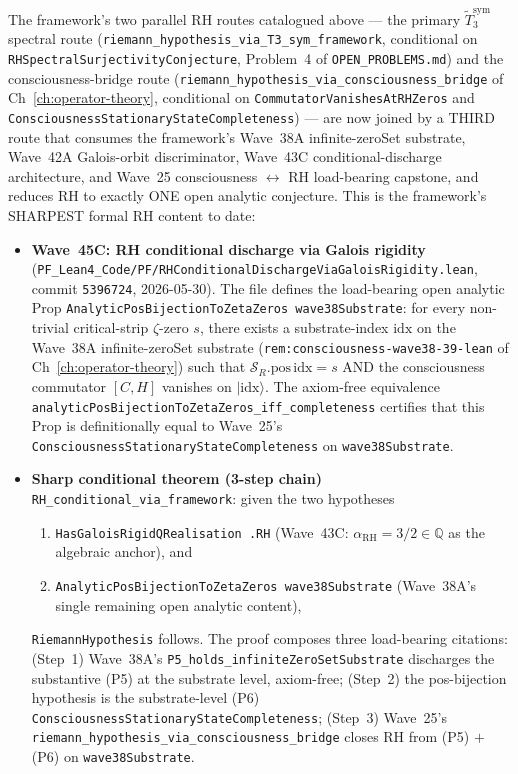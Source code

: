 \begin{remark}\label{rem:rh-wave45c-lean}
The framework's two parallel RH routes catalogued above --- the primary $\widetilde{T}_3^{\mathrm{sym}}$ spectral route (\texttt{riemann\_hypothesis\_via\_T3\_sym\_framework}, conditional on \texttt{RHSpectralSurjectivityConjecture}, Problem~4 of \texttt{OPEN\_PROBLEMS.md}) and the consciousness-bridge route (\texttt{riemann\_hypothesis\_via\_consciousness\_bridge} of Ch~\ref{ch:operator-theory}, conditional on \texttt{CommutatorVanishesAtRHZeros} and \texttt{ConsciousnessStationaryStateCompleteness}) --- are now joined by a THIRD route that consumes the framework's Wave~38A infinite-zeroSet substrate, Wave~42A Galois-orbit discriminator, Wave~43C conditional-discharge architecture, and Wave~25 consciousness $\leftrightarrow$ RH load-bearing capstone, and reduces RH to exactly ONE open analytic conjecture. This is the framework's SHARPEST formal RH content to date:
\begin{itemize}
  \item \textbf{Wave~45C: RH conditional discharge via Galois rigidity} (\texttt{PF\_Lean4\_Code/PF/RHConditionalDischargeViaGaloisRigidity.lean}, commit \texttt{5396724}, 2026-05-30). The file defines the load-bearing open analytic Prop \texttt{AnalyticPosBijectionToZetaZeros wave38Substrate}: for every non-trivial critical-strip $\zeta$-zero $s$, there exists a substrate-index $\mathrm{idx}$ on the Wave~38A infinite-zeroSet substrate (\texttt{rem:consciousness-wave38-39-lean} of Ch~\ref{ch:operator-theory}) such that $\mathcal{S}_R.\mathrm{pos}\,\mathrm{idx} = s$ AND the consciousness commutator $[C, H]$ vanishes on $|\mathrm{idx}\rangle$. The axiom-free equivalence \texttt{analyticPosBijectionToZetaZeros\_iff\_completeness} certifies that this Prop is definitionally equal to Wave~25's \texttt{ConsciousnessStationaryStateCompleteness} on \texttt{wave38Substrate}.

  \item \textbf{Sharp conditional theorem (3-step chain)} \texttt{RH\_conditional\_via\_framework}: given the two hypotheses
  \begin{enumerate}
    \item \texttt{HasGaloisRigidQRealisation .RH} (Wave~43C: $\alpha_{\mathrm{RH}} = 3/2 \in \mathbb{Q}$ as the algebraic anchor), and
    \item \texttt{AnalyticPosBijectionToZetaZeros wave38Substrate} (Wave~38A's single remaining open analytic content),
  \end{enumerate}
  \texttt{RiemannHypothesis} follows. The proof composes three load-bearing citations: (Step~1) Wave~38A's \texttt{P5\_holds\_infiniteZeroSetSubstrate} discharges the substantive (P5) at the substrate level, axiom-free; (Step~2) the pos-bijection hypothesis is the substrate-level (P6) \texttt{ConsciousnessStationaryStateCompleteness}; (Step~3) Wave~25's \texttt{riemann\_hypothesis\_via\_consciousness\_bridge} closes RH from (P5) $+$ (P6) on \texttt{wave38Substrate}.


\end{itemize}
\end{remark}
